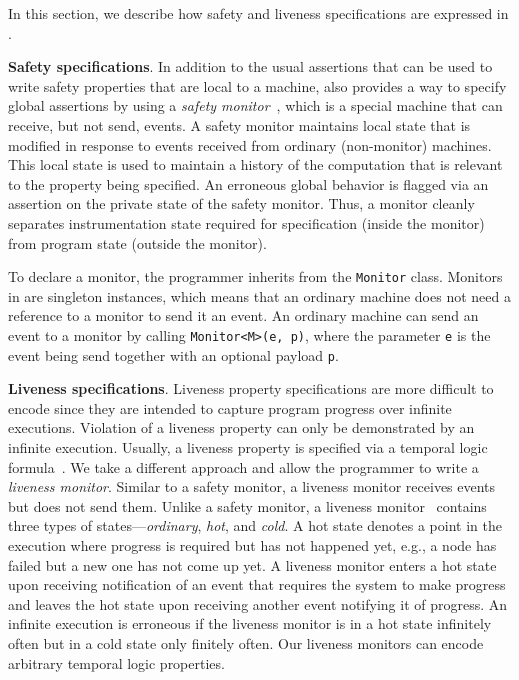 In  this section, we describe how safety and liveness specifications are expressed in \psharp.

\textbf{Safety specifications}.
In addition to the usual assertions that can be used to write safety properties that are local to a machine, \psharp also provides a way to specify global assertions by using a \emph{safety monitor}~\cite{desai2015building}, which is a special machine that can receive, but not send, events. A safety monitor maintains local state that is modified in response to events received from ordinary (non-monitor) machines. This local state is used to maintain a history of the computation that is relevant to the property being specified. An erroneous global behavior is flagged via an assertion on the private state of the safety monitor. 
Thus, a monitor cleanly separates instrumentation state required for specification (inside the monitor) from program state (outside the monitor).

To declare a monitor, the programmer inherits from the \psharp \texttt{Monitor} class. Monitors in \psharp are singleton instances, which means that an ordinary machine does not need a reference to a monitor to send it an event. An ordinary machine can send an event to a monitor by calling \texttt{Monitor<M>(e, p)}, where the parameter \texttt{e} is the event being send together with an optional payload \texttt{p}.

\textbf{Liveness specifications}.
Liveness property specifications are more difficult to encode since they are intended to capture program progress
over infinite executions.
Violation of a liveness property can only be demonstrated by an infinite execution.
Usually, a liveness property is specified via a temporal logic formula~\cite{Pnueli1977,lamport1994temporal}.
We take a different approach and allow the programmer to write a \emph{liveness monitor}.
Similar to a safety monitor, a liveness monitor receives events but does not send them.
Unlike a safety monitor, a liveness monitor~\cite{desai2015building}
contains three types of states---\emph{ordinary}, \emph{hot}, and \emph{cold}.
A hot state denotes a point in the execution where progress is required but has not happened yet,
e.g., a node has failed but a new one has not come up yet.
A liveness monitor enters a hot state upon receiving notification of an event that requires the system
to make progress and leaves the hot state upon receiving another event notifying it of progress.
An infinite execution is erroneous if the liveness monitor is in a hot state infinitely often but in a cold state only finitely often.
Our liveness monitors can encode arbitrary temporal logic properties.

